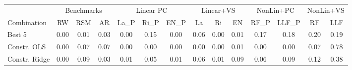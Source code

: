 \begin{tabular}{lccccccccccccc}
\toprule
& \multicolumn{3}{c}{Benchmarks} & \multicolumn{3}{c}{Linear PC} & \multicolumn{3}{c}{Linear+VS} & \multicolumn{2}{c}{NonLin+PC} & \multicolumn{2}{c}{NonLin+VS}\\
\cmidrule(lr){2-4}\cmidrule(lr){5-7}\cmidrule(lr){8-10}\cmidrule(lr){11-12}\cmidrule(lr){13-14}
Combination & RW & RSM & AR & La\_P & Ri\_P & EN\_P & La & Ri & EN & RF\_P & LLF\_P & RF & LLF \\
\midrule
Best 5        & 0.00 & 0.01 & 0.03 & 0.00 & 0.15 & 0.00 & 0.06 & 0.00 & 0.01 & 0.17 & 0.18 & 0.20 & 0.19 \\
Constr. OLS   & 0.00 & 0.07 & 0.07 & 0.00 & 0.00 & 0.00 & 0.00 & 0.00 & 0.01 & 0.00 & 0.00 & 0.07 & 0.78 \\
Constr. Ridge & 0.00 & 0.09 & 0.03 & 0.01 & 0.05 & 0.01 & 0.06 & 0.01 & 0.09 & 0.06 & 0.09 & 0.12 & 0.38 \\
\bottomrule
\end{tabular}
